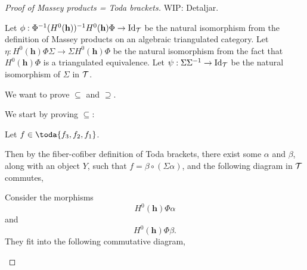 \begin{proof}[Proof of Massey products = Toda brackets]
    WIP: Detaljar.

    Let \( \phi: \Phi^{-1} (H^0(\mathbf{h}))^{-1} H^0(\mathbf{h}) \Phi \to \operatorname{Id}_{{\mathcal{T}}} \) be the natural isomorphism from the definition of Massey products on an algebraic triangulated category. Let \( \eta: H^0(\mathbf{h}) \Phi \Sigma \to \Sigma H^0(\mathbf{h}) \Phi \) be the natural isomorphism from the fact that \( H^0(\mathbf{h}) \Phi \) is a triangulated equivalence. Let \( \psi: \Sigma \Sigma^{-1} \to \operatorname{Id}_{{\mathcal{T}}} \) be the natural isomorphism of \( \Sigma \) in \( {\mathcal{T}} \).

    We want to prove \( \subseteq \) and \( \supseteq \).

    We start by proving \( \subseteq \):
    
    Let \( f \in \toda{f_3, f_2, f_1} \).

    Then by the fiber-cofiber definition of Toda brackets, there exist some \( \alpha \) and \( \beta \), along with an object \( Y \), such that \( f = \beta \circ (\Sigma \alpha) \), and the following diagram in \( {\mathcal{T}} \) commutes,
    \begin{center}
    \end{center}
    Consider the morphisms
    \[
        H^0(\mathbf{h}) \Phi \alpha
    \]
    and
    \[
        H^0(\mathbf{h}) \Phi \beta.
    \]
    They fit into the following commutative diagram,
    \begin{center}
\end{center}
\end{proof}
